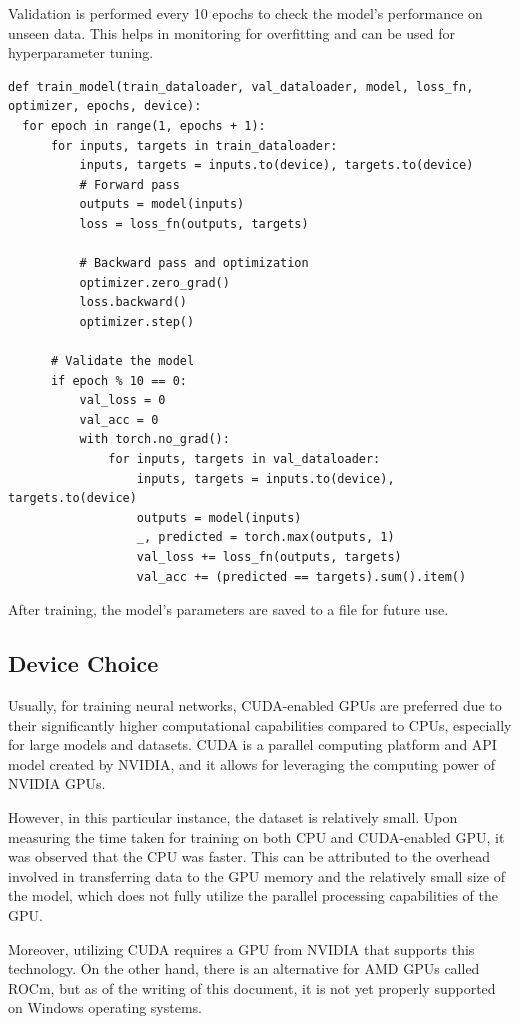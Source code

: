 Validation is performed every 10 epochs to check the model's performance on unseen data. This helps in monitoring for overfitting and can be used for hyperparameter tuning.

\begin{verbatim}
def train_model(train_dataloader, val_dataloader, model, loss_fn,
optimizer, epochs, device):
  for epoch in range(1, epochs + 1):
      for inputs, targets in train_dataloader:
          inputs, targets = inputs.to(device), targets.to(device)
          # Forward pass
          outputs = model(inputs)
          loss = loss_fn(outputs, targets)

          # Backward pass and optimization
          optimizer.zero_grad()
          loss.backward()
          optimizer.step()

      # Validate the model
      if epoch % 10 == 0:
          val_loss = 0
          val_acc = 0
          with torch.no_grad():
              for inputs, targets in val_dataloader:
                  inputs, targets = inputs.to(device), targets.to(device)
                  outputs = model(inputs)
                  _, predicted = torch.max(outputs, 1)
                  val_loss += loss_fn(outputs, targets)
                  val_acc += (predicted == targets).sum().item()
\end{verbatim}

After training, the model's parameters are saved to a file for future use.

\subsection*{Device Choice}

Usually, for training neural networks, CUDA-enabled GPUs are preferred due to their significantly higher computational capabilities compared to CPUs, especially for large models and datasets. CUDA is a parallel computing platform and API model created by NVIDIA, and it allows for leveraging the computing power of NVIDIA GPUs.

However, in this particular instance, the dataset is relatively small. Upon measuring the time taken for training on both CPU and CUDA-enabled GPU, it was observed that the CPU was faster. This can be attributed to the overhead involved in transferring data to the GPU memory and the relatively small size of the model, which does not fully utilize the parallel processing capabilities of the GPU.

Moreover, utilizing CUDA requires a GPU from NVIDIA that supports this technology. On the other hand, there is an alternative for AMD GPUs called ROCm, but as of the writing of this document, it is not yet properly supported on Windows operating systems.

